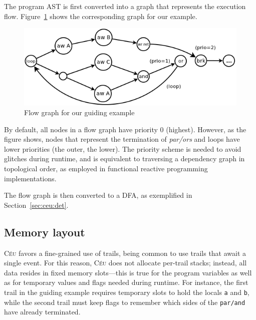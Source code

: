 \documentclass{sigplan-proc}
\newcommand{\2}{\;\;}
\newcommand{\5}{\;\;\;\;\;}
\newcommand{\CEU}{\textsc{C\'{e}u}}
\newcommand{\code}[1] {{\small{\texttt{#1}}}}
\begin{document}
The program AST is first converted into a graph that represents the execution 
flow.
Figure~\ref{fig:nfa} shows the corresponding graph for our example.

\begin{figure}[ht]
\centering
\includegraphics[scale=0.40]{nfa.png}
\caption{ Flow graph for our guiding example
\label{fig:nfa}
}
\end{figure}

By default, all nodes in a flow graph have priority $0$ (highest).
However, as the figure shows, nodes that represent the termination of 
\emph{par/ors} and loops have lower priorities (the outer, the lower).
The priority scheme is needed to avoid glitches during runtime, and is 
equivalent to traversing a dependency graph in topological order, as employed 
in functional reactive programming implementations.~\cite{frtime.embedding}

The flow graph is then converted to a DFA, as exemplified in 
Section~\ref{sec:ceu:det}.

\subsection{Memory layout}
\label{sec:impl:memory}

\CEU{} favors a fine-grained use of trails, being common to use trails that 
await a single event.
For this reason, \CEU{} does not allocate per-trail stacks; instead, all data 
resides in fixed memory slots---this is true for the program variables as well 
as for temporary values and flags needed during runtime.
For instance, the first trail in the guiding example requires temporary slots 
to hold the locals \code{a} and \code{b}, while the second trail must keep 
flags to remember which sides of the \code{par/and} have already terminated.
\end{document}
